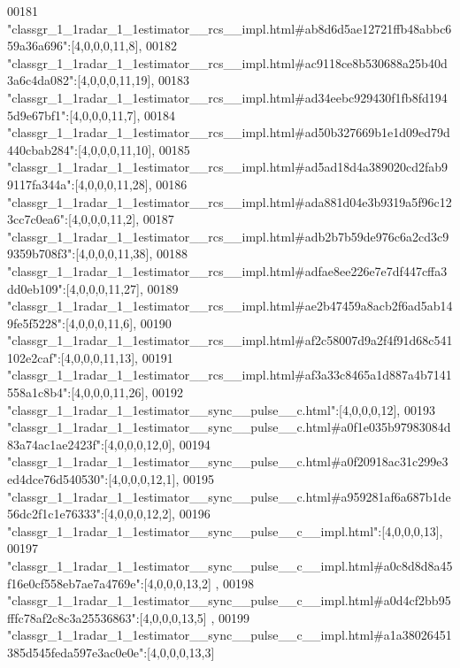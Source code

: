 \begin{DoxyCode}
00181 \textcolor{stringliteral}{"classgr\_1\_1radar\_1\_1estimator\_\_rcs\_\_impl.html#ab8d6d5ae12721ffb48abbc659a36a696"}:[4,0,0,0,11,8],
00182 \textcolor{stringliteral}{"classgr\_1\_1radar\_1\_1estimator\_\_rcs\_\_impl.html#ac9118ce8b530688a25b40d3a6c4da082"}:[4,0,0,0,11,19],
00183 \textcolor{stringliteral}{"classgr\_1\_1radar\_1\_1estimator\_\_rcs\_\_impl.html#ad34eebc929430f1fb8fd1945d9e67bf1"}:[4,0,0,0,11,7],
00184 \textcolor{stringliteral}{"classgr\_1\_1radar\_1\_1estimator\_\_rcs\_\_impl.html#ad50b327669b1e1d09ed79d440cbab284"}:[4,0,0,0,11,10],
00185 \textcolor{stringliteral}{"classgr\_1\_1radar\_1\_1estimator\_\_rcs\_\_impl.html#ad5ad18d4a389020cd2fab99117fa344a"}:[4,0,0,0,11,28],
00186 \textcolor{stringliteral}{"classgr\_1\_1radar\_1\_1estimator\_\_rcs\_\_impl.html#ada881d04e3b9319a5f96c123cc7c0ea6"}:[4,0,0,0,11,2],
00187 \textcolor{stringliteral}{"classgr\_1\_1radar\_1\_1estimator\_\_rcs\_\_impl.html#adb2b7b59de976c6a2cd3c99359b708f3"}:[4,0,0,0,11,38],
00188 \textcolor{stringliteral}{"classgr\_1\_1radar\_1\_1estimator\_\_rcs\_\_impl.html#adfae8ee226e7e7df447cffa3dd0eb109"}:[4,0,0,0,11,27],
00189 \textcolor{stringliteral}{"classgr\_1\_1radar\_1\_1estimator\_\_rcs\_\_impl.html#ae2b47459a8acb2f6ad5ab149fe5f5228"}:[4,0,0,0,11,6],
00190 \textcolor{stringliteral}{"classgr\_1\_1radar\_1\_1estimator\_\_rcs\_\_impl.html#af2c58007d9a2f4f91d68c541102e2caf"}:[4,0,0,0,11,13],
00191 \textcolor{stringliteral}{"classgr\_1\_1radar\_1\_1estimator\_\_rcs\_\_impl.html#af3a33c8465a1d887a4b7141558a1c8b4"}:[4,0,0,0,11,26],
00192 \textcolor{stringliteral}{"classgr\_1\_1radar\_1\_1estimator\_\_sync\_\_pulse\_\_c.html"}:[4,0,0,0,12],
00193 \textcolor{stringliteral}{"classgr\_1\_1radar\_1\_1estimator\_\_sync\_\_pulse\_\_c.html#a0f1e035b97983084d83a74ac1ae2423f"}:[4,0,0,0,12,0],
00194 \textcolor{stringliteral}{"classgr\_1\_1radar\_1\_1estimator\_\_sync\_\_pulse\_\_c.html#a0f20918ac31c299e3ed4dce76d540530"}:[4,0,0,0,12,1],
00195 \textcolor{stringliteral}{"classgr\_1\_1radar\_1\_1estimator\_\_sync\_\_pulse\_\_c.html#a959281af6a687b1de56dc2f1c1e76333"}:[4,0,0,0,12,2],
00196 \textcolor{stringliteral}{"classgr\_1\_1radar\_1\_1estimator\_\_sync\_\_pulse\_\_c\_\_impl.html"}:[4,0,0,0,13],
00197 \textcolor{stringliteral}{"classgr\_1\_1radar\_1\_1estimator\_\_sync\_\_pulse\_\_c\_\_impl.html#a0c8d8d8a45f16e0cf558eb7ae7a4769e"}:[4,0,0,0,13,2]
      ,
00198 \textcolor{stringliteral}{"classgr\_1\_1radar\_1\_1estimator\_\_sync\_\_pulse\_\_c\_\_impl.html#a0d4cf2bb95fffc78af2c8c3a25536863"}:[4,0,0,0,13,5]
      ,
00199 \textcolor{stringliteral}{"classgr\_1\_1radar\_1\_1estimator\_\_sync\_\_pulse\_\_c\_\_impl.html#a1a38026451385d545feda597e3ac0e0e"}:[4,0,0,0,13,3]

\end{DoxyCode}
